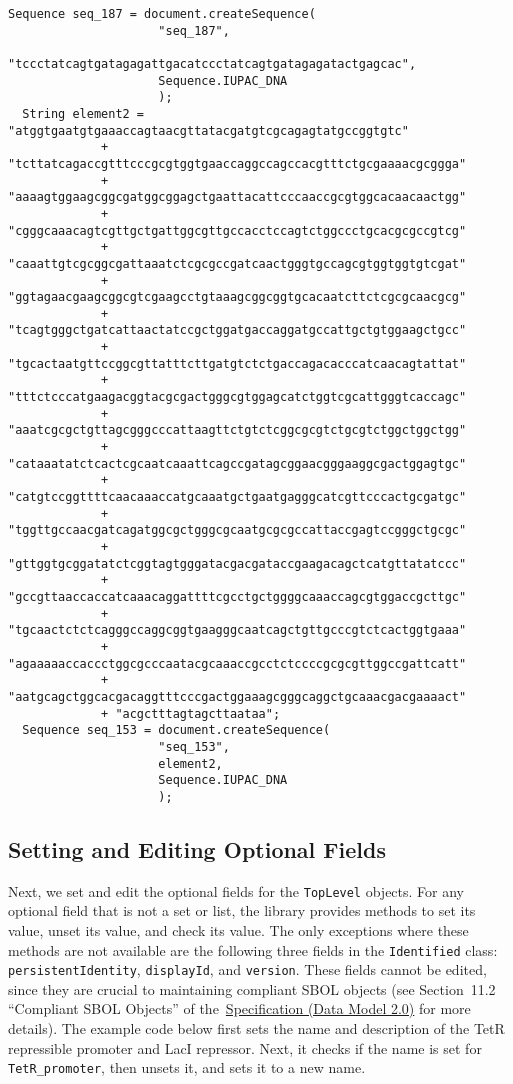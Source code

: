 \begin{minipage}{0.95\textwidth} 
\begin{lstlisting}[basicstyle=\footnotesize\ttfamily]
  Sequence seq_187 = document.createSequence(
                     "seq_187",
                     "tccctatcagtgatagagattgacatccctatcagtgatagagatactgagcac",
                     Sequence.IUPAC_DNA
                     );
  String element2 = "atggtgaatgtgaaaccagtaacgttatacgatgtcgcagagtatgccggtgtc"
             + "tcttatcagaccgtttcccgcgtggtgaaccaggccagccacgtttctgcgaaaacgcggga"
             + "aaaagtggaagcggcgatggcggagctgaattacattcccaaccgcgtggcacaacaactgg"
             + "cgggcaaacagtcgttgctgattggcgttgccacctccagtctggccctgcacgcgccgtcg"
             + "caaattgtcgcggcgattaaatctcgcgccgatcaactgggtgccagcgtggtggtgtcgat"
             + "ggtagaacgaagcggcgtcgaagcctgtaaagcggcggtgcacaatcttctcgcgcaacgcg"
             + "tcagtgggctgatcattaactatccgctggatgaccaggatgccattgctgtggaagctgcc"
             + "tgcactaatgttccggcgttatttcttgatgtctctgaccagacacccatcaacagtattat"
             + "tttctcccatgaagacggtacgcgactgggcgtggagcatctggtcgcattgggtcaccagc"
             + "aaatcgcgctgttagcgggcccattaagttctgtctcggcgcgtctgcgtctggctggctgg"
             + "cataaatatctcactcgcaatcaaattcagccgatagcggaacgggaaggcgactggagtgc"
             + "catgtccggttttcaacaaaccatgcaaatgctgaatgagggcatcgttcccactgcgatgc"
             + "tggttgccaacgatcagatggcgctgggcgcaatgcgcgccattaccgagtccgggctgcgc"
             + "gttggtgcggatatctcggtagtgggatacgacgataccgaagacagctcatgttatatccc"
             + "gccgttaaccaccatcaaacaggattttcgcctgctggggcaaaccagcgtggaccgcttgc"
             + "tgcaactctctcagggccaggcggtgaagggcaatcagctgttgcccgtctcactggtgaaa"
             + "agaaaaaccaccctggcgcccaatacgcaaaccgcctctccccgcgcgttggccgattcatt"
             + "aatgcagctggcacgacaggtttcccgactggaaagcgggcaggctgcaaacgacgaaaact"
             + "acgctttagtagcttaataa";
  Sequence seq_153 = document.createSequence(
                     "seq_153",
                     element2,
                     Sequence.IUPAC_DNA
                     );
\end{lstlisting}
\end{minipage}


\subsection*{Setting and Editing Optional Fields}

Next, we set and edit the optional fields for the \lstinline+TopLevel+ objects. For any optional field that is not a set or list, the library provides methods to set its value, unset its value, and check its value. The only exceptions where these methods are not available are the following three fields in the \lstinline+Identified+ class: \lstinline+persistentIdentity+, \lstinline+displayId+, and
\lstinline+version+.  These fields cannot be edited, since they are crucial to maintaining
compliant SBOL objects (see Section~11.2 ``Compliant SBOL Objects'' of the~\href{http://sbolstandard.org/downloads/specification-data-model-2-0/}{Specification
  (Data Model 2.0)} for more details).  The example code below first sets the name and description of the
TetR repressible promoter and LacI repressor.  Next, it checks if the name is set for \lstinline+TetR_promoter+, then unsets it, and sets it to a new name.
 
